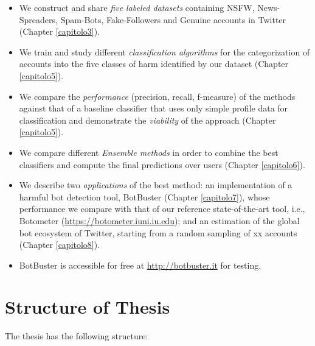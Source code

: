 \begin{itemize}
	\item[\PencilRight] We construct and share \emph{five labeled datasets} containing NSFW, News-Spreaders, Spam-Bots, Fake-Followers and Genuine accounts in Twitter (Chapter \ref{capitolo3}).
	
	\item[\PencilRight] We train and study different \emph{classification algorithms}	for the categorization of accounts into the five classes of harm identified by our dataset (Chapter \ref{capitolo5}).
	
	\item[\PencilRight] We compare the \emph{performance} (precision, recall, f-measure) of the methods against that of a baseline classifier that uses only simple profile data for classification and demonstrate the \emph{viability} of the approach (Chapter \ref{capitolo5}).
	
	\item[\PencilRight] We compare different \emph{Ensemble methods} in order to combine the best classifiers and compute  the final predictions over users (Chapter \ref{capitolo6}).
	
	\item[\PencilRight] We describe two \emph{applications} of the best method: an implementation of a harmful bot detection tool, BotBuster (Chapter \ref{capitolo7}), whose performance we compare with that of our reference state-of-the-art tool, i.e., Botometer (\url{https://botometer.iuni.iu.edu}); and an estimation of the global bot ecosystem of Twitter, starting from a random sampling of xx accounts (Chapter \ref{capitolo8}).
	
	\item[\PencilRight] BotBuster is accessible for free at \url{http://botbuster.it} for testing.
\end{itemize}


\section{Structure of Thesis}

The thesis has the following structure:


